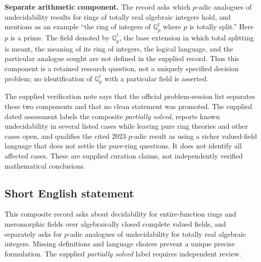 \documentclass[11pt]{article}
\newcommand{\Q}{\mathbb{Q}}
\begin{document}
\textbf{Separate arithmetic component.} The record asks which \(p\)-adic analogues of undecidability results for rings of totally real algebraic integers hold, and mentions as an example ``the ring of integers of \(\Q_p^t\) where \(p\) is totally split.'' Here \(p\) is a prime. The field denoted by \(\Q_p^t\), the base extension in which total splitting is meant, the meaning of its ring of integers, the logical language, and the particular analogue sought are not defined in the supplied record. Thus this component is a retained research question, not a uniquely specified decision problem; no identification of \(\Q_p^t\) with a particular field is asserted.

The supplied verification note says that the official problem-session list separates these two components and that no clean statement was promoted. The supplied dated assessment labels the composite \emph{partially solved}, reports known undecidability in several listed cases while leaving pure ring theories and other cases open, and qualifies the cited 2023 \(p\)-adic result as using a richer valued-field language that does not settle the pure-ring questions. It does not identify all affected cases. These are supplied curation claims, not independently verified mathematical conclusions.
\subsection{Short English statement}
This composite record asks about decidability for entire-function rings and meromorphic fields over algebraically closed complete valued fields, and separately asks for \(p\)-adic analogues of undecidability for totally real algebraic integers. Missing definitions and language choices prevent a unique precise formulation. The supplied \emph{partially solved} label requires independent review.
\end{document}
